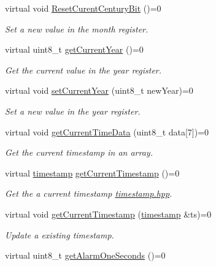 \begin{DoxyCompactItemize}
virtual void \mbox{\hyperlink{classreal_time_clock_a50e19a6b0aef44719e91e3e753da0dce}{Reset\+Curent\+Century\+Bit}} ()=0
\begin{DoxyCompactList}\small\item\em Set a new value in the month register. \end{DoxyCompactList}\item 
virtual uint8\+\_\+t \mbox{\hyperlink{classreal_time_clock_a0cb99c34e2d6a089a62c8bea760c5add}{get\+Current\+Year}} ()=0
\begin{DoxyCompactList}\small\item\em Get the current value in the year register. \end{DoxyCompactList}\item 
virtual void \mbox{\hyperlink{classreal_time_clock_a4d6e8056f52cea52bab5c635c0860c12}{set\+Current\+Year}} (uint8\+\_\+t new\+Year)=0
\begin{DoxyCompactList}\small\item\em Set a new value in the year register. \end{DoxyCompactList}\item 
virtual void \mbox{\hyperlink{classreal_time_clock_a2d1613b3cd572f62bc9faaea6a0f82f2}{get\+Current\+Time\+Data}} (uint8\+\_\+t data\mbox{[}7\mbox{]})=0
\begin{DoxyCompactList}\small\item\em Get the current timestamp in an array. \end{DoxyCompactList}\item 
virtual \mbox{\hyperlink{classtimestamp}{timestamp}} \mbox{\hyperlink{classreal_time_clock_a08a7854ef9cef638996a267a953c9b14}{get\+Current\+Timestamp}} ()=0
\begin{DoxyCompactList}\small\item\em Get the a current timestamp \mbox{\hyperlink{timestamp_8hpp_source}{timestamp.\+hpp}}. \end{DoxyCompactList}\item 
virtual void \mbox{\hyperlink{classreal_time_clock_aa7402c5941b089d4e86b2af20d48b7ba}{get\+Current\+Timestamp}} (\mbox{\hyperlink{classtimestamp}{timestamp}} \&ts)=0
\begin{DoxyCompactList}\small\item\em Update a existing timestamp. \end{DoxyCompactList}\item 
virtual uint8\+\_\+t \mbox{\hyperlink{classreal_time_clock_af4ff1775432a08af7e41db135d16bf65}{get\+Alarm\+One\+Seconds}} ()=0

\end{DoxyCompactItemize}
